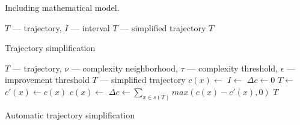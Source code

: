 Including mathematical model.

\begin{algorithm}
  \begin{algorithmic}[1]
	  \Require $T$ --- trajectory, $I$ --- interval
	  \Ensure $T$ --- simplified trajectory
			\State \Return $T$ 
		\EndProcedure
  \end{algorithmic}
	\caption{Trajectory simplification}
  \label{alg:simplify}
\end{algorithm}

\begin{algorithm}
  \begin{algorithmic}[1]
	  \Require $T$ --- trajectory, $\nu$ --- complexity neighborhood, $\tau$ --- complexity threshold, $\epsilon$ --- improvement threshold
	  \Ensure $T$ --- simplified trajectory
			\Repeat
        \State $c(x) \gets$ 
			  \State $I \gets$ 
			  \State
				\State $\Delta c \gets 0$
				  \State $T \gets$ 
				  \State
					\State $c'(x) \gets c(x)$ 
				  \State $c(x) \gets$ 
					\State
					\State $\Delta c \gets \sum_{x \in s(T)}{max(c(x) - c'(x), 0)}$
					\State {}
			  \EndIf
			\State
			\State \Return $T$
		\EndProcedure
  \end{algorithmic}
	\caption{Automatic trajectory simplification}
  \label{alg:auto-simplify}
\end{algorithm}